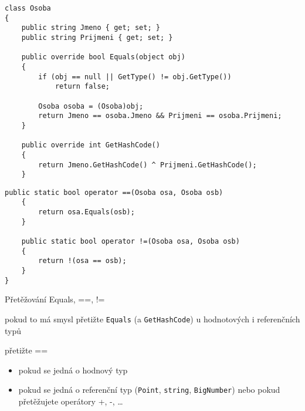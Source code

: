 \begin{frame}[fragile]
\begin{bonusblock}{}
\begin{lstlisting}[basicstyle=\small]
class Osoba
{
	public string Jmeno { get; set; }
	public string Prijmeni { get; set; }
	
	public override bool Equals(object obj)
	{
	    if (obj == null || GetType() != obj.GetType())
	        return false;
	
	    Osoba osoba = (Osoba)obj;
	    return Jmeno == osoba.Jmeno && Prijmeni == osoba.Prijmeni;
	}
	
	public override int GetHashCode()
	{
		return Jmeno.GetHashCode() ^ Prijmeni.GetHashCode();
	}
\end{lstlisting}
\end{bonusblock}
\end{frame}


\begin{frame}[fragile]
\begin{bonusblock}{}
\begin{lstlisting}[basicstyle=\small]
	public static bool operator ==(Osoba osa, Osoba osb)
	{
	    return osa.Equals(osb);
	}
	
	public static bool operator !=(Osoba osa, Osoba osb)
	{
	    return !(osa == osb);
	}
}
\end{lstlisting}
\end{bonusblock}
\vskip -3mm
\begin{bitemize}{Přetěžování Equals, ==, !=}
\item pokud to má smysl přetižte \lstinline|Equals| (a \lstinline|GetHashCode|) u hodnotových i referenčních typů
\item přetižte ==
\begin{itemize}
\item pokud se jedná o hodnový typ
\item pokud se jedná o referenční  typ (\lstinline|Point|, \lstinline|string|, \lstinline|BigNumber|) nebo pokud přetěžujete operátory +, -, \ldots
\end{itemize}
\end{bitemize}
\end{frame}







